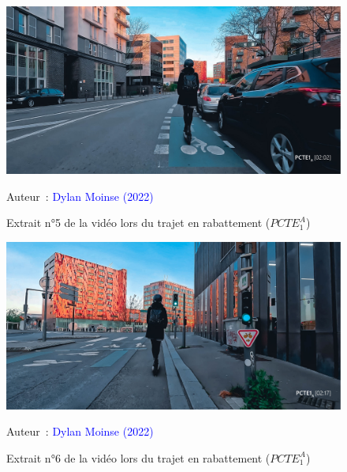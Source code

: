     \begin{figure}[h!]\vspace*{4pt}
        \caption*{Extrait n°5 de la vidéo lors du trajet en rabattement (\(PCTE^{A}_{1}\))}
        \centerline{\includegraphics[width=0.75\columnwidth]{src/Figures/Annexes/Extrait_Video_PCTE1_Access_5.jpg}}
        \vspace{5pt}
        \begin{flushright}\scriptsize{
        Auteur~: \textcolor{blue}{Dylan Moinse (2022)}
        }\end{flushright}
    \end{figure}

    \begin{figure}[h!]\vspace*{4pt}
        \caption*{Extrait n°6 de la vidéo lors du trajet en rabattement (\(PCTE^{A}_{1}\))}
        \centerline{\includegraphics[width=0.75\columnwidth]{src/Figures/Annexes/Extrait_Video_PCTE1_Access_6.jpg}}
        \vspace{5pt}
        \begin{flushright}\scriptsize{
        Auteur~: \textcolor{blue}{Dylan Moinse (2022)}
        }\end{flushright}
    \end{figure}

